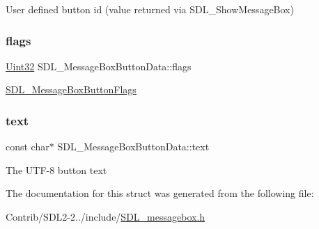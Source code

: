 User defined button id (value returned via S\+D\+L\+\_\+\+Show\+Message\+Box) \mbox{\label{struct_s_d_l___message_box_button_data_a426c8b5da0e718242c7840706d95de0b}} 
\subsubsection{\texorpdfstring{flags}{flags}}
{\footnotesize\ttfamily \mbox{\hyperlink{_s_d_l__stdinc_8h_add440eff171ea5f55cb00c4a9ab8672d}{Uint32}} S\+D\+L\+\_\+\+Message\+Box\+Button\+Data\+::flags}

\mbox{\hyperlink{_s_d_l__messagebox_8h_ad21beffe204426be6efbf4990c916ad0}{S\+D\+L\+\_\+\+Message\+Box\+Button\+Flags}} \mbox{\label{struct_s_d_l___message_box_button_data_af35f3062f0577159284c8828caaf08e4}} 
\subsubsection{\texorpdfstring{text}{text}}
{\footnotesize\ttfamily const char$\ast$ S\+D\+L\+\_\+\+Message\+Box\+Button\+Data\+::text}

The U\+T\+F-\/8 button text 

The documentation for this struct was generated from the following file\+:\begin{DoxyCompactItemize}
\item 
Contrib/\+S\+D\+L2-\/2../include/\mbox{\hyperlink{_s_d_l__messagebox_8h}{S\+D\+L\+\_\+messagebox.\+h}}\end{DoxyCompactItemize}
